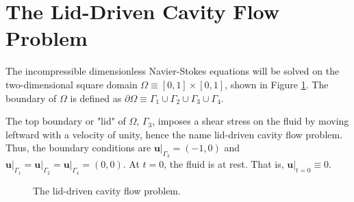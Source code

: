\section{The Lid-Driven Cavity Flow Problem}

The incompressible dimensionless Navier-Stokes equations will be solved on the two-dimensional square domain $\Omega \equiv \left[ 0, 1 \right] \times \left[ 0, 1 \right]$, shown in Figure \ref{fig:problem}. The boundary of $\Omega$ is defined as $\partial \Omega \equiv \Gamma_1 \cup \Gamma_2 \cup \Gamma_3 \cup \Gamma_4$. 

The top boundary or "lid" of $\Omega$, $\Gamma_3$, imposes a shear stress on the fluid by moving leftward with a velocity of unity, hence the name lid-driven cavity flow problem. Thus, the boundary conditions are $\left. \mathbf{u} \right|_{\Gamma_3} = (-1, 0)$ and $\left. \mathbf{u} \right|_{\Gamma_1} = \left. \mathbf{u} \right|_{\Gamma_2} = \left. \mathbf{u} \right|_{\Gamma_4} = (0, 0)$. At $t = 0$, the fluid is at rest. That is, $ \left. \mathbf{u} \right|_{t = 0} \equiv 0$.

\begin{figure}[ht]
    \centering
    \caption{The lid-driven cavity flow problem.}
    \label{fig:problem}
\end{figure}

